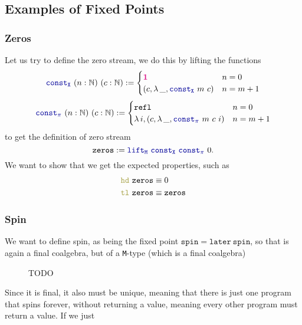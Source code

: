\documentclass[twoside,11pt,openright]{report}
\theoremstyle{plain} %
\theoremstyle{definition}
\theoremstyle{remark}
\newcommand*{\type}[1]{\textcolor{magenta!90!black}{#1}}
\newcommand*{\unit}{\type{\textbf{1}}}
\newcommand*{\function}[1]{\textcolor{blue!60!black}{\ensuremath{\mathtt{#1}}}}
\newcommand*{\destructor}[1]{\textcolor{yellow!60!black}{\ensuremath{\mathtt{#1}}}}
\begin{document}
\subsection{Examples of Fixed Points}
\subsubsection{Zeros}
Let us try to define the zero stream, we do this by lifting the functions
\begin{equation}
  \function{const_X}~(n : \mathbb{N})~(c : \mathbb{N})  := \begin{cases} \unit & n = 0 \\ (c , \lambda\,\_, \function{const_X}~m~c) & n = m + 1 \end{cases}
\end{equation}
\begin{equation}
  \function{const_\pi}~(n : \mathbb{N})~(c : \mathbb{N}) := \begin{cases} \mathtt{refl} & n = 0 \\ \lambda\,i,(c , \lambda\,\_, \function{const_\pi}~m~c~i) & n = m + 1 \end{cases}
\end{equation}
to get the definition of zero stream
\begin{equation}
  \mathtt{zeros} := \function{lift_M}~\function{const_X}~\function{const_\pi}~0.
\end{equation}
We want to show that we get the expected properties, such as
\begin{align}
  \destructor{hd}~\mathtt{zeros} &\equiv 0 \\
  \destructor{tl}~\mathtt{zeros} &\equiv \mathtt{zeros}
\end{align}

\subsubsection{Spin}
We want to define spin, as being the fixed point \(\mathtt{spin} = \mathtt{later}~\mathtt{spin}\), so that is again a final coalgebra, but of a \texttt{M}-type (which is a final coalgebra)

\begin{figure}[h]
  \centering
  \caption{TODO}
\end{figure}
\noindent Since it is final, it also must be unique, meaning that there is just one program that spins forever, without returning a value, meaning every other program must return a value. If we just
\end{document}
